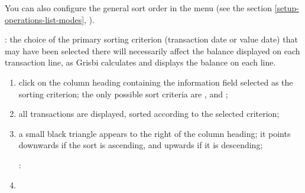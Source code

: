 You can also configure the general sort order in the  menu (see the section \vref{setup-operations-list-modes}, ).

\Note{}: the choice of the \gls{primary sorting} criterion (transaction date or value date) that may have been selected there will necessarily affect the balance displayed on each transaction line, as Grisbi calculates and displays the balance on each line.





\begin{enumerate}
	\item click on the column heading containing the information field selected as the \gls{sorting} criterion; the only possible sort criteria are ,  and ;
	\item all transactions are displayed, sorted according to the selected criterion;
	\item a small black triangle appears to the right of the column heading; it points downwards if the sort is ascending, and upwards if it is descending;
	
	\Note{}: 
	
	\item 
\end{enumerate}


